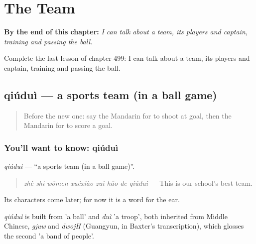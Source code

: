 
\chapter{The Team}
\label{ch:zh-the-team}

\begin{chapteropening}
\textbf{By the end of this chapter:} \emph{I can talk about a team, its players and captain, training and passing the ball.}

Complete the last lesson of chapter 499: I can talk about a team, its players and captain, training and passing the ball.
\end{chapteropening}

\section[qiúduì]{qiúduì — a sports team (in a ball game)}

\label{lesson:ZH-C499-qiudui}



\begin{quote}
Before the new one: say the Mandarin for to shoot at goal, then the Mandarin for to score a goal.
\end{quote}

\subsection*{You'll want to know: qiúduì}
\emph{qiúduì} — \textquotedblleft{}a sports team (in a ball game)\textquotedblright{}.

\begin{quote}
\emph{zhè shì wǒmen xuéxiào zuì hǎo de qiúduì} — This is our school's best team.
\end{quote}

Its characters come later; for now it is a word for the ear.

\begin{cousinweb}
\emph{qiúduì} is built from  'a ball' and \emph{duì} 'a troop', both inherited from Middle Chinese, \emph{gjuw} and \emph{dwojH} (Guangyun, in Baxter's transcription), which glosses the second 'a band of people'.
\end{cousinweb}

